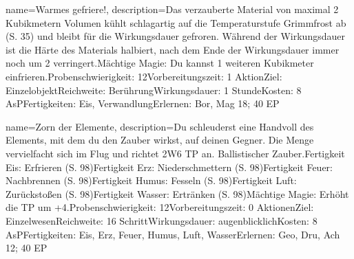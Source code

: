 {
    name={Warmes gefriere!},
    description={Das verzauberte Material von maximal 2 Kubikmetern Volumen kühlt schlagartig auf die Temperaturstufe Grimmfrost ab (S. 35) und bleibt für die Wirkungsdauer gefroren. Während der Wirkungsdauer ist die Härte des Materials halbiert, nach dem Ende der Wirkungsdauer immer noch um 2 verringert.\newline Mächtige Magie: Du kannst 1 weiteren Kubikmeter einfrieren.\newline Probenschwierigkeit: 12\newline Vorbereitungszeit: 1 Aktion\newline Ziel: Einzelobjekt\newline Reichweite: Berührung\newline Wirkungsdauer: 1 Stunde\newline Kosten: 8 AsP\newline Fertigkeiten: Eis, Verwandlung\newline Erlernen: Bor, Mag 18; 40 EP}
}


{
    name={Zorn der Elemente},
    description={Du schleuderst eine Handvoll des Elements, mit dem du den Zauber wirkst, auf deinen Gegner. Die Menge vervielfacht sich im Flug und richtet 2W6 TP an. Ballistischer Zauber.\newline Fertigkeit Eis: Erfrieren (S. 98)\newline Fertigkeit Erz: Niederschmettern (S. 98)\newline Fertigkeit Feuer: Nachbrennen (S. 98)\newline Fertigkeit Humus: Fesseln (S. 98)\newline Fertigkeit Luft: Zurückstoßen (S. 98)\newline Fertigkeit Wasser: Ertränken (S. 98)\newline Mächtige Magie: Erhöht die TP um +4.\newline Probenschwierigkeit: 12\newline Vorbereitungszeit: 0 Aktionen\newline Ziel: Einzelwesen\newline Reichweite: 16 Schritt\newline Wirkungsdauer: augenblicklich\newline Kosten: 8 AsP\newline Fertigkeiten: Eis, Erz, Feuer, Humus, Luft, Wasser\newline Erlernen: Geo, Dru, Ach 12; 40 EP}
}


